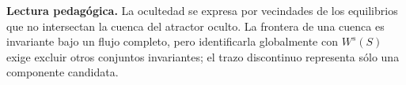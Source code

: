 \begin{center}
\begin{minipage}{\linewidth}
\smallskip
\begin{minipage}{0.92\linewidth}
\small\textbf{Lectura pedagógica.}
La ocultedad se expresa por vecindades de los equilibrios que no intersectan la
cuenca del atractor oculto. La frontera de una cuenca es invariante bajo un
flujo completo, pero identificarla globalmente con $W^s(S)$ exige excluir
otros conjuntos invariantes; el trazo discontinuo representa sólo una
componente candidata.
\end{minipage}
\end{minipage}
\end{center}
